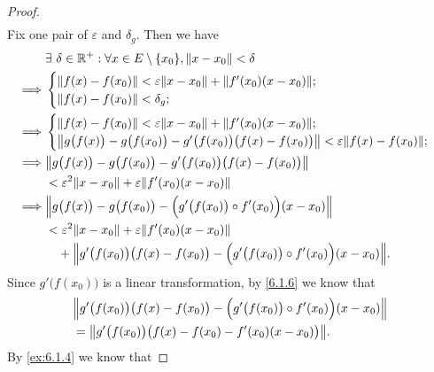 \begin{proof}
\begin{align*}
  \end{align*}
  Fix one pair of \(\varepsilon\) and \(\delta_g\).
  Then we have
  \begin{align*}
             & \exists\ \delta \in \R^+ : \forall x \in E \setminus \{x_0\}, \norm*{x - x_0} < \delta                                       \\
    \implies & \begin{cases}
                 \norm*{f(x) - f(x_0)} < \varepsilon \norm*{x - x_0} + \norm*{f'(x_0)(x - x_0)}; \\
                 \norm*{f(x) - f(x_0)} < \delta_g;
               \end{cases}                                              \\
    \implies & \begin{cases}
                 \norm*{f(x) - f(x_0)} < \varepsilon \norm*{x - x_0} + \norm*{f'(x_0)(x - x_0)}; \\
                 \norm*{g\big(f(x)\big) - g\big(f(x_0)\big) - g'\big(f(x_0)\big) \big(f(x) - f(x_0)\big)} < \varepsilon \norm*{f(x) - f(x_0)};
               \end{cases} \\
    \implies & \norm*{g\big(f(x)\big) - g\big(f(x_0)\big) - g'\big(f(x_0)\big) \big(f(x) - f(x_0)\big)}                                     \\
             & < \varepsilon^2 \norm*{x - x_0} + \varepsilon \norm*{f'(x_0)(x - x_0)}                                                       \\
    \implies & \norm*{g\big(f(x)\big) - g\big(f(x_0)\big) - \Big(g'\big(f(x_0)\big) \circ f'(x_0)\Big) (x - x_0)}                           \\
             & < \varepsilon^2 \norm*{x - x_0} + \varepsilon \norm*{f'(x_0)(x - x_0)}                                                       \\
             & \quad + \norm*{g'\big(f(x_0)\big) \big(f(x) - f(x_0)\big) - \Big(g'\big(f(x_0)\big) \circ f'(x_0)\Big) (x - x_0)}.
  \end{align*}
  Since \(g'\big(f(x_0)\big)\) is a linear transformation, by \cref{6.1.6} we know that
  \begin{align*}
     & \norm*{g'\big(f(x_0)\big) \big(f(x) - f(x_0)\big) - \Big(g'\big(f(x_0)\big) \circ f'(x_0)\Big) (x - x_0)} \\
     & = \norm*{g'\big(f(x_0)\big) \big(f(x) - f(x_0) - f'(x_0) (x - x_0)\big)}.
  \end{align*}
  By \cref{ex:6.1.4} we know that

\end{proof}
